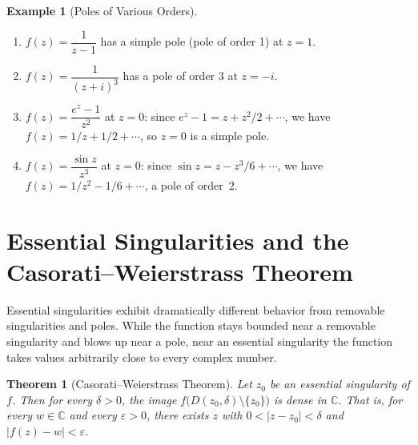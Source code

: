 \documentclass[12pt,a4paper,openany]{book}
\theoremstyle{definition}
\newtheorem{example}[definition]{Example}
\theoremstyle{plain}
\newtheorem{theorem}[definition]{Theorem}
\theoremstyle{remark}
\newcommand{\C}{\mathbb{C}}
\newcommand{\abs}[1]{\left|#1\right|}
\begin{document}
\begin{example}[Poles of Various Orders]\label{ex:poles-orders}
\begin{enumerate}[label=(\alph*)]
  \item $f(z)=\dfrac{1}{z-1}$ has a simple pole (pole of order 1) at $z=1$.
  \item $f(z)=\dfrac{1}{(z+i)^3}$ has a pole of order 3 at $z=-i$.
  \item $f(z)=\dfrac{e^z-1}{z^2}$ at $z=0$: since $e^z-1=z+z^2/2+\cdots$,
    we have $f(z)=1/z+1/2+\cdots$, so $z=0$ is a simple pole.
  \item $f(z)=\dfrac{\sin z}{z^3}$ at $z=0$: since $\sin z = z - z^3/6+\cdots$,
    we have $f(z) = 1/z^2 - 1/6 + \cdots$, a pole of order~2.
\end{enumerate}
\end{example}

\section{Essential Singularities and the Casorati--Weierstrass Theorem}
\label{sec:essential}

Essential singularities exhibit dramatically different behavior from removable
singularities and poles. While the function stays bounded near a removable
singularity and blows up near a pole, near an essential singularity the function
takes values arbitrarily close to every complex number.

\begin{theorem}[Casorati--Weierstrass Theorem]\label{thm:casorati-weierstrass}
Let $z_0$ be an essential singularity of $f$. Then for every $\delta>0$, the
image $f\bigl(D(z_0,\delta)\setminus\{z_0\}\bigr)$ is dense in $\C$. That is,
for every $w\in\C$ and every $\varepsilon>0$, there exists $z$ with
$0<\abs{z-z_0}<\delta$ and $\abs{f(z)-w}<\varepsilon$.
\end{theorem}
\end{document}
